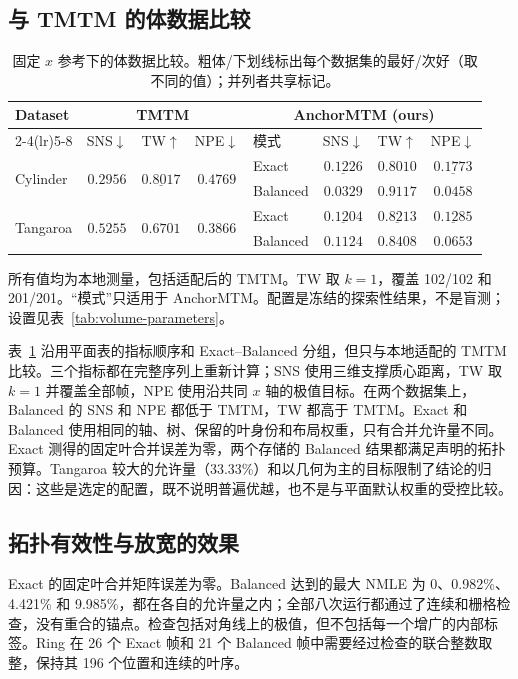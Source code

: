 \documentclass[fontset=none,zihao=5,a4paper]{ctexart}
\begin{document}
\subsection{与 TMTM 的体数据比较}
\begin{table}[htbp]
\centering
\caption{固定 $x$ 参考下的体数据比较。粗体/下划线标出每个数据集的最好/次好（取不同的值）；并列者共享标记。}\label{tab:volume-comparison}
\footnotesize\setlength{\tabcolsep}{3pt}
\begin{tabular}{@{}lccc lccc@{}}
\toprule
\multirow{2}{*}{Dataset} & \multicolumn{3}{c}{TMTM} & \multicolumn{4}{c}{AnchorMTM (ours)} \\
\cmidrule(lr){2-4}\cmidrule(lr){5-8}
 & SNS$\downarrow$ & TW$\uparrow$ & NPE$\downarrow$ & 模式 & SNS$\downarrow$ & TW$\uparrow$ & NPE$\downarrow$ \\
\midrule
\multirow{2}{*}{Cylinder} & \multirow{2}{*}{$0.2956$} & \multirow{2}{*}{$\underline{0.8017}$} & \multirow{2}{*}{$0.4769$} & Exact & $\underline{0.1226}$ & $0.8010$ & $\underline{0.1773}$ \\
 &  &  &  & Balanced & $\mathbf{0.0329}$ & $\mathbf{0.9117}$ & $\mathbf{0.0458}$ \\
\multirow{2}{*}{Tangaroa} & \multirow{2}{*}{$0.5255$} & \multirow{2}{*}{$0.6701$} & \multirow{2}{*}{$0.3866$} & Exact & $\underline{0.1204}$ & $\underline{0.8213}$ & $\underline{0.1285}$ \\
 &  &  &  & Balanced & $\mathbf{0.1124}$ & $\mathbf{0.8408}$ & $\mathbf{0.0653}$ \\
\bottomrule
\end{tabular}
\par\smallskip
\parbox{\linewidth}{\footnotesize 所有值均为本地测量，包括适配后的 TMTM。TW 取 $k=1$，覆盖 102/102 和 201/201。“模式”只适用于 AnchorMTM。配置是冻结的探索性结果，不是盲测；设置见表~\ref{tab:volume-parameters}。}
\end{table}
表~\ref{tab:volume-comparison} 沿用平面表的指标顺序和 Exact--Balanced 分组，但只与本地适配的 TMTM 比较。三个指标都在完整序列上重新计算；SNS 使用三维支撑质心距离，TW 取 $k=1$ 并覆盖全部帧，NPE 使用沿共同 $x$ 轴的极值目标。在两个数据集上，Balanced 的 SNS 和 NPE 都低于 TMTM，TW 都高于 TMTM。Exact 和 Balanced 使用相同的轴、树、保留的叶身份和布局权重，只有合并允许量不同。Exact 测得的固定叶合并误差为零，两个存储的 Balanced 结果都满足声明的拓扑预算。Tangaroa 较大的允许量（33.33\%）和以几何为主的目标限制了结论的归因：这些是选定的配置，既不说明普遍优越，也不是与平面默认权重的受控比较。

\subsection{拓扑有效性与放宽的效果}
Exact 的固定叶合并矩阵误差为零。Balanced 达到的最大 NMLE 为 0、0.982\%、4.421\% 和 9.985\%，都在各自的允许量之内；全部八次运行都通过了连续和栅格检查，没有重合的锚点。检查包括对角线上的极值，但不包括每一个增广的内部标签。Ring 在 26 个 Exact 帧和 21 个 Balanced 帧中需要经过检查的联合整数取整，保持其 196 个位置和连续的叶序。
\end{document}
